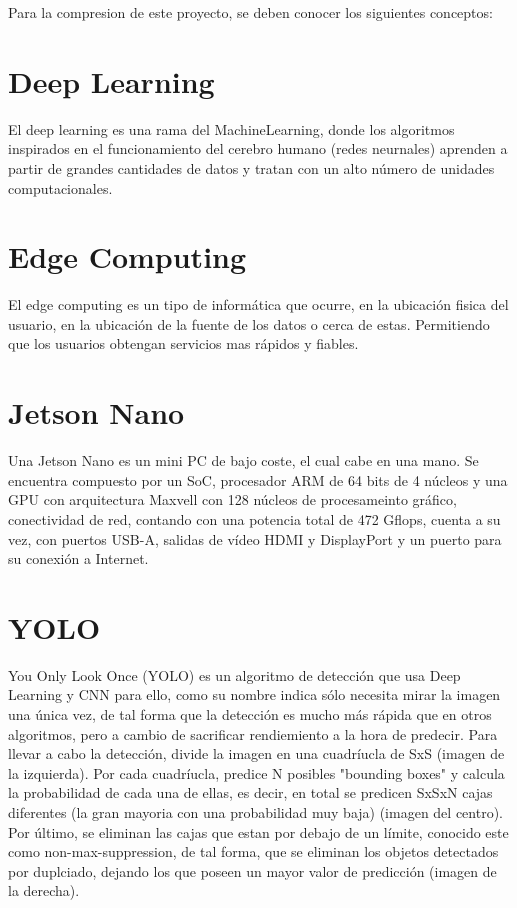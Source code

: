 
Para la compresion de este proyecto, se deben conocer los siguientes conceptos:

\section{Deep Learning} 

El deep learning \cite{deepLearning} es una rama del MachineLearning, donde los algoritmos inspirados en el funcionamiento del cerebro humano (redes neurnales) aprenden a partir de 
grandes cantidades de datos y tratan con un alto número de unidades computacionales.


\section{Edge Computing}

El edge computing \cite{edgeComputing} es un tipo de informática que ocurre, en la ubicación fisica del usuario, en la ubicación de la fuente de los datos o cerca de estas. Permitiendo 
que los usuarios obtengan servicios mas rápidos y fiables.

\section{Jetson Nano}

Una Jetson Nano \cite{jetsonNano} es un mini PC de bajo coste, el cual cabe en una mano. Se encuentra compuesto por un SoC, procesador ARM de 64 bits de 4 núcleos y una GPU con arquitectura Maxvell con 128 núcleos de procesameinto gráfico, conectividad de red, 
contando con una potencia total de 472 Gflops, cuenta a su vez, con puertos USB-A, salidas de vídeo HDMI y DisplayPort y un puerto para su conexión a Internet.


\section{YOLO}

You Only Look Once (YOLO) \cite{yolov4} es un algoritmo de detección que usa Deep Learning y CNN para ello, como su nombre indica sólo necesita mirar la imagen una única vez, de tal forma que la detección es mucho más rápida que en otros algoritmos, pero a cambio de sacrificar rendiemiento a la hora de predecir.
Para llevar a cabo la detección, divide la imagen en una cuadríucla de SxS (imagen de la izquierda). Por cada cuadríucla, predice N posibles "bounding boxes" y calcula la probabilidad de cada una de ellas, es decir, en total se predicen SxSxN cajas diferentes (la gran mayoria con una probabilidad muy baja) (imagen del centro). 
Por último, se eliminan las cajas que estan por debajo de un límite, conocido este como non-max-suppression, de tal forma, que se eliminan los objetos detectados por duplciado, dejando los que poseen un mayor valor de predicción (imagen de la derecha).

